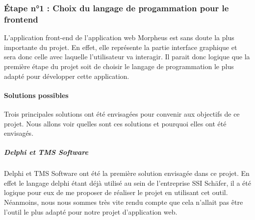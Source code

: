 \documentclass[a4paper, 12pt, french]{article}
\begin{document}

				\subsubsection{Étape n°1 : Choix du langage de progammation pour le frontend}
					L'application front-end de l'application web Morpheus est sans doute la plus importante du projet. En effet, elle représente la partie interface graphique et sera donc celle avec laquelle l'utilisateur va interagir. Il parait donc logique que la première étape du projet soit de choisir le langage de programmation le plus adapté pour développer cette application.
	
					\paragraph{Solutions possibles\\}
						Trois principales solutions ont été envisagées pour convenir aux objectifs de ce projet. Nous allons voir quelles sont ces solutions et pourquoi elles ont été envisagés.
						\subparagraph{Delphi et TMS Software\\}
							Delphi et TMS Software ont été la première solution envisagée dans ce projet. En effet le langage delphi étant déjà utilisé au sein de l'entreprise SSI Schäfer, il a été logique pour eux de me proposer de réaliser le projet en utilisant cet outil. Néanmoins, nous nous sommes très vite rendu compte que cela n'allait pas être l'outil le plus adapté pour notre projet d'application web.%
					
\end{document}
